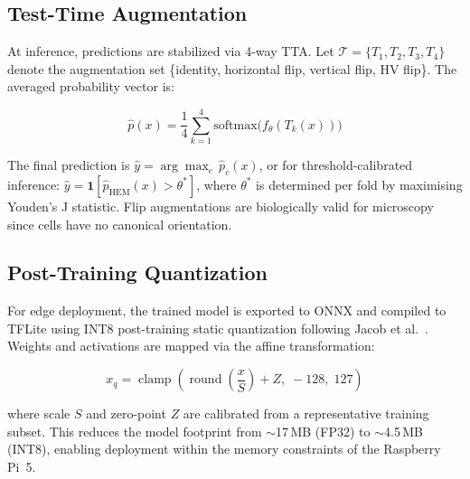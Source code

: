 \documentclass[journal]{IEEEtran}
\begin{document}
    \subsection{Test-Time Augmentation}

    At inference, predictions are stabilized via 4-way TTA.
    Let $\mathcal{T} = \{T_1, T_2, T_3, T_4\}$ denote the augmentation
    set \{identity, horizontal flip, vertical flip, HV flip\}.
    The averaged probability vector is:

    \begin{equation}
    \hat{p}(x) = \frac{1}{4}\sum_{k=1}^{4}
    \text{softmax}\bigl(f_\theta(T_k(x))\bigr)
    \label{eq:tta}
    \end{equation}

    The final prediction is $\hat{y} = \arg\max_c\, \hat{p}_c(x)$,
    or for threshold-calibrated inference:
    $\hat{y} = \mathbf{1}[\hat{p}_{\text{HEM}}(x) > \theta^*]$,
    where $\theta^*$ is determined per fold by maximising
    Youden's J statistic. Flip augmentations are biologically
    valid for microscopy since cells have no canonical orientation.

    \subsection{Post-Training Quantization}

    For edge deployment, the trained model is exported to ONNX and
    compiled to TFLite using INT8 post-training static quantization
    following Jacob et al.~\cite{b_jacob2018}. Weights and activations
    are mapped via the affine transformation:

    \begin{equation}
    x_q = \operatorname{clamp}\!\left(
    \operatorname{round}\!\left(\frac{x}{S}\right) + Z,\;
    -128,\; 127\right)
    \label{eq:quant}
    \end{equation}

    where scale $S$ and zero-point $Z$ are calibrated from a
    representative training subset. This reduces the model footprint
    from $\sim$17\,MB (FP32) to $\sim$4.5\,MB (INT8), enabling
    deployment within the memory constraints of the Raspberry Pi~5.
\end{document}
